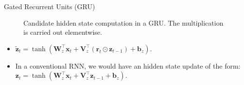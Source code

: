 \begin{vbframe}{Gated Recurrent Units (GRU)}
     \begin{figure}
      \centering
      \caption{\footnotesize{Candidate hidden state computation in a GRU. The multiplication is carried out elementwise.}}
  \end{figure}
  \begin{itemize}

  \item  $\tilde{\mathbf{z}}_t = \tanh(\mathbf{W}_{z}^\top \mathbf{x}_t + \mathbf{V}_{z}^\top \left(\mathbf{r}_t \odot \mathbf{z}_{t-1}\right)  + \mathbf{b}_z).$
   \item In a conventional RNN, we would have an hidden state update of the form:  $\mathbf{z}_t = \tanh(\mathbf{W}_{z}^\top \mathbf{x}_t + \mathbf{V}_{z}^\top \mathbf{z}_{t-1} + \mathbf{b}_z).$
   \end{itemize}
  
\end{vbframe}
